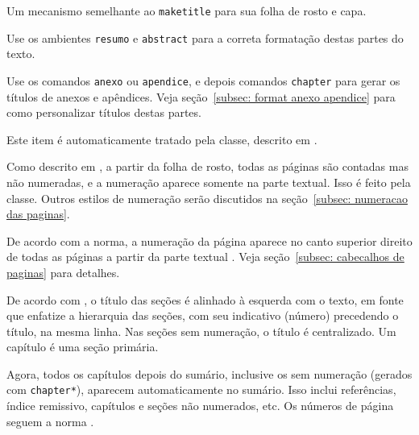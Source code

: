 \documentclass[espaco=simples,appendix=Name]{abnt}
\newcommand{\descrtype}{descriptionbf}
\renewenvironment{description}%
  {\expandafter\csname\descrtype\endcsname\edef\enddescrtype{end\descrtype}}
  {\expandafter\csname\enddescrtype\endcsname}
\newcommand{\bs}{\symbol{92}}   %
\begin{document}
\def\descrtype{descriptionit}
\begin{description}

\item[Folha de rosto e capa] Um mecanismo semelhante ao
  \texttt{\bs maketitle} para sua folha de rosto e capa.

\item[Resumo e abstract] Use os ambientes
  \texttt{resumo} e 
  \texttt{abstract} para a
  correta formatação destas partes do texto. 
  
\item[Anexos e apêndices] Use os comandos \texttt{\bs anexo} ou
  \texttt{\bs apendice}, e depois comandos \texttt{\bs chapter} para gerar
  os títulos de anexos e apêndices.
  Veja seção~\ref{subsec: format anexo apendice} para como personalizar
  títulos destas partes. 
  
\item[Espaçamento entrelinhas] Este item é automaticamente
  tratado pela classe, descrito em \cite{NBR14724:2001}.
  
\item[Numeração das páginas] Como descrito em
  \cite[seção 5.4]{NBR14724:2001}, a partir da folha de rosto, todas as
  páginas são contadas mas não numeradas, e a numeração aparece somente na
  parte textual. Isso é feito pela classe. Outros estilos de numeração
  serão discutidos na seção~\ref{subsec: numeracao das paginas}.
  
\item[Cabeçalhos de página] De acordo com a norma, a numeração da página
  aparece no canto superior direito de todas as páginas a partir da parte
  textual \cite[seção 5.4]{NBR14724:2001}. Veja
  seção~\ref{subsec: cabecalhos de paginas} para detalhes.
  
\item[Títulos de capítulos e seções] De acordo com
  \cite{NBR6024:1989}, o título das seções é alinhado à
  esquerda com o texto, em fonte que enfatize a hierarquia das seções, com
  seu indicativo (número) precedendo o título, na mesma linha. Nas seções
  sem numeração, o título é centralizado. Um capítulo é uma seção primária.
  
\item[Sumário] Agora, todos os capítulos depois do sumário,
  inclusive os sem numeração (gerados com \texttt{\bs chapter*}), aparecem
  automaticamente no sumário. Isso inclui referências, índice remissivo,
  capítulos e seções não numerados, etc. Os números de página seguem a
  norma \cite{NBR6027:1989}.
  
  

\end{description}
\end{document}
